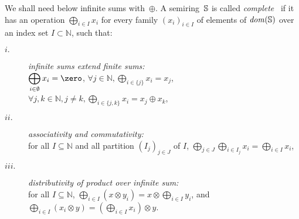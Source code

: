 \noindent
{}
We shall need below infinite sums with~$\oplus$.
A semiring~$\mathbb{S}$ is called \emph{complete}~\cite{Droste09handbook} 
if it has an %
operation $\bigoplus_{i \in I} x_i$
for every family
$(x_i)_{i \in I}$ %
of elements of $\mathit{dom}(\mathbb{S})$ over an index set $I \subset \mathbb{N}$, such that:
\begin{description}
\item[$i.$]
\emph{infinite sums extend finite sums:}\\
$\displaystyle\bigoplus_{i \in \emptyset} x_i = \zero$,\quad 
      $\forall j\in \mathbb{N}, \displaystyle\bigoplus_{i \in \{ j \}} x_i = x_j$,
      $\forall j, k\in \mathbb{N}, j\neq k, 
      \displaystyle\bigoplus_{i \in \{ j, k \}} x_i = x_j \oplus x_k$,
%
\item[$ii.$]
\emph{associativity and commutativity:}\\
for all $I \subseteq \mathbb{N}$
and all partition $(I_{j})_{j \in J}$ of $I$, %
\(
\displaystyle
\bigoplus_{j \in J}\bigoplus_{i \in I_j} x_i = 
\bigoplus_{i \in I} x_i
\),
%
\item[$iii.$] 
\emph{distributivity of product over infinite sum:}\\
for all $I \subseteq \mathbb{N}$,
\(
\displaystyle
\bigoplus_{i \in I} (x \otimes y_i) = x \otimes \bigoplus_{i\in I} y_i\), and
\(
\displaystyle
\bigoplus_{i \in I} (x_i \otimes y) = (\bigoplus_{i \in I} x_i ) \otimes y\).
\end{description}





